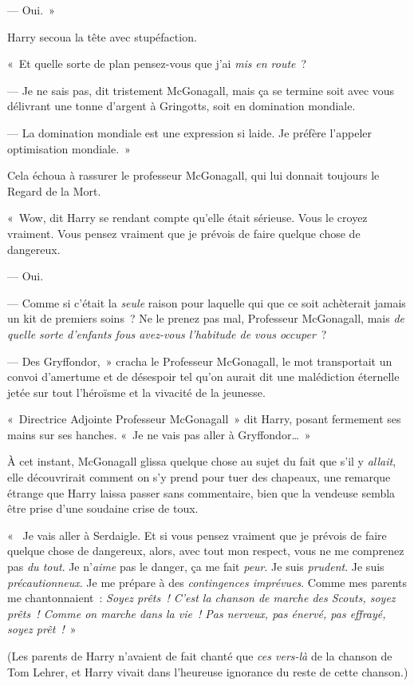 --- Oui.~»

Harry secoua la tête avec stupéfaction.

«~Et quelle sorte de plan pensez-vous que j'ai \emph{mis} \emph{en route}~?

--- Je ne sais pas, dit tristement McGonagall, mais ça se termine soit avec vous délivrant une tonne d'argent à Gringotts, soit en domination mondiale.

--- La domination mondiale est une expression si laide. Je préfère l'appeler optimisation mondiale.~»

Cela échoua à rassurer le professeur McGonagall, qui lui donnait toujours le Regard de la Mort.

«~Wow, dit Harry se rendant compte qu'elle était sérieuse. Vous le croyez vraiment. Vous pensez vraiment que je prévois de faire quelque chose de dangereux.

--- Oui.

--- Comme si c'était la \emph{seule} raison pour laquelle qui que ce soit achèterait jamais un kit de premiers soins~? Ne le prenez pas mal, Professeur McGonagall, mais \emph{de quelle sorte d'enfants fous avez-vous l'habitude de vous occuper}~?

--- Des Gryffondor,~» cracha le Professeur McGonagall, le mot transportait un convoi d'amertume et de désespoir tel qu'on aurait dit une malédiction éternelle jetée sur tout l'héroïsme et la vivacité de la jeunesse.

«~Directrice Adjointe Professeur McGonagall~» dit Harry, posant fermement ses mains sur ses hanches. «~Je ne vais pas aller à Gryffondor…~»

À cet instant, McGonagall glissa quelque chose au sujet du fait que s'il y \emph{allait}, elle découvrirait comment on s'y prend pour tuer des chapeaux, une remarque étrange que Harry laissa passer sans commentaire, bien que la vendeuse sembla être prise d'une soudaine crise de toux.

«~ Je vais aller à Serdaigle. Et si vous pensez vraiment que je prévois de faire quelque chose de dangereux, alors, avec tout mon respect, vous ne me comprenez pas \emph{du tout}. Je n'\emph{aime} pas le danger, ça me fait \emph{peur}. Je suis \emph{prudent}. Je suis \emph{précautionneux}. Je me prépare à des \emph{contingences imprévues}. Comme mes parents me chantonnaient~: \emph{Soyez prêts~! C'est la chanson de marche des Scouts, soyez prêts~! Comme on marche dans la vie~! Pas nerveux, pas énervé, pas effrayé, soyez prêt~!}~»

(Les parents de Harry n'avaient de fait chanté que \emph{ces vers-là} de la chanson de Tom Lehrer, et Harry vivait dans l'heureuse ignorance du reste de cette chanson.)

